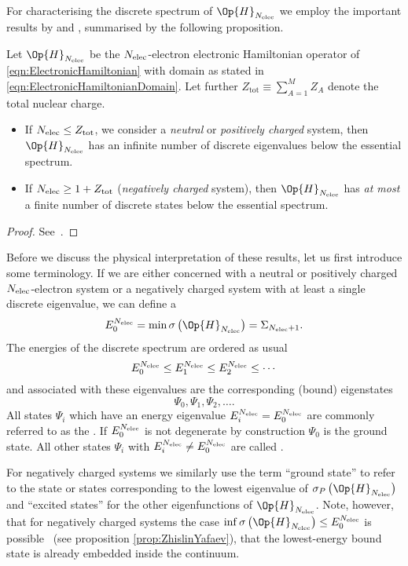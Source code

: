For characterising the discrete spectrum of $\Op{H}_{\Nelec}$
we employ the important results by \citet{Zhislin1961} and \citet{Yafaev1976},
summarised by the following proposition.
\begin{prop}
	\label{prop:ZhislinYafaev}
	Let $\Op{H}_{\Nelec}$ be the $N_\text{elec}$-electron electronic Hamiltonian
	operator of \eqref{eqn:ElectronicHamiltonian}
	with domain as stated in \eqref{eqn:ElectronicHamiltonianDomain}.
	Let further $Z_\text{tot} \equiv \sum_{A=1}^M Z_A$ denote the total nuclear charge.
	\begin{itemize}
		\item If $N_\text{elec} \leq Z_\text{tot}$, \ie we consider a \emph{neutral}
			or \emph{positively charged} system, then
			$\Op{H}_{\Nelec}$
			has an infinite number of discrete eigenvalues
			below the essential spectrum.
		\item If $N_\text{elec} \geq 1 + Z_\text{tot}$ (\emph{negatively charged} system),
			then $\Op{H}_{\Nelec}$ has \emph{at most} a finite number of discrete
			states below the essential spectrum.
	\end{itemize}
	\begin{proof}
		See~\cite{Zhislin1961,Yafaev1976}.
	\end{proof}
\end{prop}
Before we discuss the physical interpretation of these results,
let us first introduce some terminology.
If we are either concerned with a neutral or positively charged
$N_\text{elec}$-electron system or a negatively charged system
with at least a single discrete eigenvalue, we can define a 
\begin{equation}
	E^{\Nelec}_0 = \min \sigma\left(\Op{H}_{\Nelec}\right) = \Sigma_{\Nelec+1}.
	\label{eqn:GroundStateEnergy}
\end{equation}
The energies of the discrete spectrum are ordered as usual
\[ E^{N_\text{elec}}_0 \leq E^{N_\text{elec}}_1 \leq E^{N_\text{elec}}_2 \leq \cdots \]
and associated with these eigenvalues are the corresponding (bound) eigenstates
\[ \Psi_0, \Psi_1, \Psi_2, \ldots. \]
All states $\Psi_i$ which have an energy eigenvalue $E^{N_\text{elec}}_i = E^{N_\text{elec}}_0$
are commonly referred to as the .
If $E^{N_\text{elec}}_0$ is not degenerate by construction
$\Psi_0$ is the ground state.
All other states $\Psi_i$ with $E^{N_\text{elec}}_i \neq E^{N_\text{elec}}_0$
are called .

For negatively charged systems we similarly use the
term ``ground state'' to refer to the state or states corresponding
to the lowest eigenvalue of $\sigma_P\left(\Op{H}_{\Nelec}\right)$
and ``excited states'' for the other eigenfunctions of $\Op{H}_{\Nelec}$.
Note, however, that for negatively charged systems
the case \mbox{$\inf \sigma\left(\Op{H}_{\Nelec}\right) \leq E^{\Nelec}_0$} is possible%
~(see proposition \ref{prop:ZhislinYafaev}),
\ie that the lowest-energy bound state is already embedded inside the continuum.

